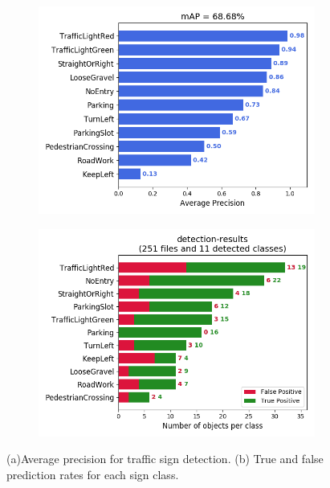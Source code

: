 \begin{figure}[h]
  \centering
  \begin{subfigure}[b]{0.45\linewidth}
    \includegraphics[width=\linewidth]{figures/experiments/mAP.png}
    \caption{}
  \end{subfigure}
  \begin{subfigure}[b]{0.45\linewidth}
    \includegraphics[width=\linewidth]{figures/experiments/detection-results-info.png}
    \caption{}
  \end{subfigure}
  \caption[Evaluation of traffic sign detection and recognition]{(a)Average
    precision for traffic sign detection. (b) True and false prediction rates
    for each sign class.}
  \label{figure:average-precision}
\end{figure}


